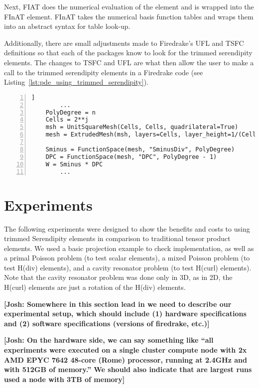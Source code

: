 \documentclass[manuscript,screen]{acmart}
\newcommand\josh[1]{\textbf{\textcolor[rgb]{0,.5,1}{[Josh: #1]}}}
\begin{document}
Next, FIAT does the numerical evaluation of the element and is wrapped into the FInAT element.  FInAT takes the numerical basis function tables and wraps them into an abstract syntax for table look-up.    

Additionally, there are small adjustments made to Firedrake's UFL and TSFC definitions so that each of the packages know to look for the trimmed serendipity elements.  The changes to TSFC and UFL are what then allow the user to make a call to the trimmed serendipity elements in a Firedrake code (see Listing~\ref{lst:pde_using_trimmed_serendipity}).

\lstset{language=Python}
\begin{lstlisting}[frame=single, caption={Setting up Firedrake to use the trimmed serendipity elements in a mixed Poisson problem in 3d.}, label={lst:pde_using_trimmed_serendipity}, numbers=left, firstnumber=1, xleftmargin=20pt, xrightmargin=20pt]] 
        ...
    PolyDegree = n
    Cells = 2**j
    msh = UnitSquareMesh(Cells, Cells, quadrilateral=True)
    mesh = ExtrudedMesh(msh, layers=Cells, layer_height=1/(Cells))
    
    Sminus = FunctionSpace(mesh, "SminusDiv", PolyDegree)
    DPC = FunctionSpace(mesh, "DPC", PolyDegree - 1)
    W = Sminus * DPC
        ...
\end{lstlisting}

  \section{Experiments}
    
   The following experiments were designed to show the benefits and costs to using trimmed Serendipity elements in comparison to traditional tensor product elements.  We used a basic projection example to check implementation, as well as a primal Poisson problem (to test scalar elements), a mixed Poisson problem (to test H(div) elements), and a cavity resonator problem (to test H(curl) elements).  Note that the cavity resonator problem was done only in 3D, as in 2D, the H(curl) elements are just a rotation of the H(div) elements. 

\josh{Somewhere in this section lead in we need to describe our experimental setup, which should include (1) hardware specifications and (2) software specifications (versions of firedrake, etc.)}

\josh{On the hardware side, we can say something like ``all experiments were executed on a single cluster compute node with 2x AMD EPYC 7642 48-core (Rome) processor, running at 2.4GHz and with 512GB of memory.''  We should also indicate that are largest runs used a node with 3TB of memory}
\end{document}
